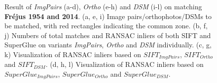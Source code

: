 \begin{figure}[htbp]
\begin{center}
{\begin{minipage}[t]{0.48\linewidth}
			\end{minipage}%
		}
		\caption{{\scriptsize Result of \textit{ImgPairs} (a-d), \textit{Ortho} (e-h) and \textit{DSM} (i-l) on matching \textbf{Fr{\'e}jus 1954 and 2014}. (a, e, i) Image pairs/orthophotos/DSMs to be matched, with red rectangles indicating the common zone. (b, f, j) Numbers of total matches and RANSAC inliers of both SIFT and SuperGlue on variants \textit{ImgPairs}, \textit{Ortho} and \textit{DSM} individually. (c, g, k) Visualization of RANSAC inliers based on $SIFT_{ImgPairs}$, $SIFT_{Ortho}$ and $SIFT_{DSM}$. (d, h, l) Visualization of RANSAC inliers based on $SuperGlue_{ImgPairs}$, $SuperGlue_{Ortho}$ and $SuperGlue_{DSM}$.}}
		\label{MatchVizFrejus1954DSM}
	\end{center}
\end{figure} 



